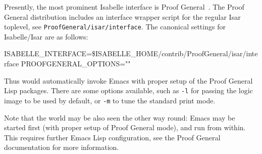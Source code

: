 \begin{isabellebody}
\begin{isamarkuptext}
  Presently, the most prominent Isabelle interface is Proof
  General~\cite{proofgeneral}.
  The Proof General distribution includes an interface wrapper script
  for the regular Isar toplevel, see \verb|ProofGeneral/isar/interface|.  The canonical settings for
  Isabelle/Isar are as follows:

\begin{ttbox}
ISABELLE_INTERFACE=\$ISABELLE_HOME/contrib/ProofGeneral/isar/interface
PROOFGENERAL_OPTIONS=""
\end{ttbox}

  Thus \hyperlink{executable.Isabelle}{\mbox{}} would automatically invoke Emacs with
  proper setup of the Proof General Lisp packages.  There are some
  options available, such as \verb|-l| for passing the logic
  image to be used by default, or \verb|-m| to tune the
  standard print mode.
  
  \medskip Note that the world may be also seen the other way round:
  Emacs may be started first (with proper setup of Proof General
  mode), and \hyperlink{executable.isabelle-process}{\mbox{}} run from within.  This
  requires further Emacs Lisp configuration, see the Proof General
  documentation \cite{proofgeneral} for more information.%
\end{isamarkuptext}%
\isamarkuptrue%
%
\isadelimtheory
%
\endisadelimtheory
%
\isatagtheory
{}\isamarkupfalse%
%
\endisatagtheory
{\isafoldtheory}%
%
\isadelimtheory
%
\endisadelimtheory
\end{isabellebody}%
